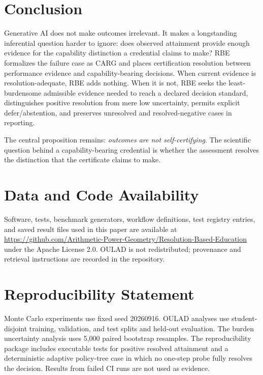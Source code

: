 \documentclass[11pt]{article}
\begin{document}
\section{Conclusion}
Generative AI does not make outcomes irrelevant. It makes a longstanding inferential question harder to ignore: does observed attainment provide enough evidence for the capability distinction a credential claims to make? RBE formalizes the failure case as CARG and places certification resolution between performance evidence and capability-bearing decisions. When current evidence is resolution-adequate, RBE adds nothing. When it is not, RBE seeks the least-burdensome admissible evidence needed to reach a declared decision standard, distinguishes positive resolution from mere low uncertainty, permits explicit defer/abstention, and preserves unresolved and resolved-negative cases in reporting.

The central proposition remains: \emph{outcomes are not self-certifying}. The scientific question behind a capability-bearing credential is whether the assessment resolves the distinction that the certificate claims to make.

\section*{Data and Code Availability}
Software, tests, benchmark generators, workflow definitions, test registry entries, and saved result files used in this paper are available at \url{https://github.com/Arithmetic-Power-Geometry/Resolution-Based-Education} under the Apache License 2.0. OULAD is not redistributed; provenance and retrieval instructions are recorded in the repository.

\section*{Reproducibility Statement}
Monte Carlo experiments use fixed seed 20260916. OULAD analyses use student-disjoint training, validation, and test splits and held-out evaluation. The burden uncertainty analysis uses 5,000 paired bootstrap resamples. The reproducibility package includes executable tests for positive resolved attainment and a deterministic adaptive policy-tree case in which no one-step probe fully resolves the decision. Results from failed CI runs are not used as evidence.
\end{document}
